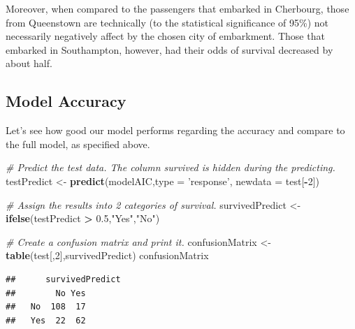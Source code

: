 \documentclass[12,]{article}
\newenvironment{Shaded}{\begin{snugshade}}{\end{snugshade}}
\newcommand{\KeywordTok}[1]{\textcolor[rgb]{0.13,0.29,0.53}{\textbf{#1}}}
\newcommand{\DataTypeTok}[1]{\textcolor[rgb]{0.13,0.29,0.53}{#1}}
\newcommand{\DecValTok}[1]{\textcolor[rgb]{0.00,0.00,0.81}{#1}}
\newcommand{\FloatTok}[1]{\textcolor[rgb]{0.00,0.00,0.81}{#1}}
\newcommand{\StringTok}[1]{\textcolor[rgb]{0.31,0.60,0.02}{#1}}
\newcommand{\CommentTok}[1]{\textcolor[rgb]{0.56,0.35,0.01}{\textit{#1}}}
\newcommand{\OperatorTok}[1]{\textcolor[rgb]{0.81,0.36,0.00}{\textbf{#1}}}
\newcommand{\NormalTok}[1]{#1}
\begin{document}
Moreover, when compared to the passengers that embarked in Cherbourg,
those from Queenstown are technically (to the statistical significance
of 95\%) not necessarily negatively affect by the chosen city of
embarkment. Those that embarked in Southampton, however, had their odds
of survival decreased by about half.

\subsection{Model Accuracy}\label{model-accuracy}

Let's see how good our model performs regarding the accuracy and compare
to the full model, as specified above.

\begin{Shaded}
\begin{Highlighting}[]
  \CommentTok{# Predict the test data. The column survived is hidden during the predicting.}
\NormalTok{testPredict <-}\StringTok{ }\KeywordTok{predict}\NormalTok{(modelAIC,}\DataTypeTok{type =} \StringTok{'response'}\NormalTok{, }\DataTypeTok{newdata =}\NormalTok{ test[}\OperatorTok{-}\DecValTok{2}\NormalTok{]) }

  \CommentTok{# Assign the results into 2 categories of survival.}
\NormalTok{survivedPredict <-}\StringTok{ }\KeywordTok{ifelse}\NormalTok{(testPredict }\OperatorTok{>}\StringTok{ }\FloatTok{0.5}\NormalTok{,}\StringTok{"Yes"}\NormalTok{,}\StringTok{"No"}\NormalTok{) }

  \CommentTok{# Create a confusion matrix and print it.}
\NormalTok{confusionMatrix <-}\StringTok{ }\KeywordTok{table}\NormalTok{(test[,}\DecValTok{2}\NormalTok{],survivedPredict) }
\NormalTok{confusionMatrix}
\end{Highlighting}
\end{Shaded}

\begin{verbatim}
##      survivedPredict
##        No Yes
##   No  108  17
##   Yes  22  62
\end{verbatim}

\begin{Shaded}
\end{Shaded}
\end{document}
